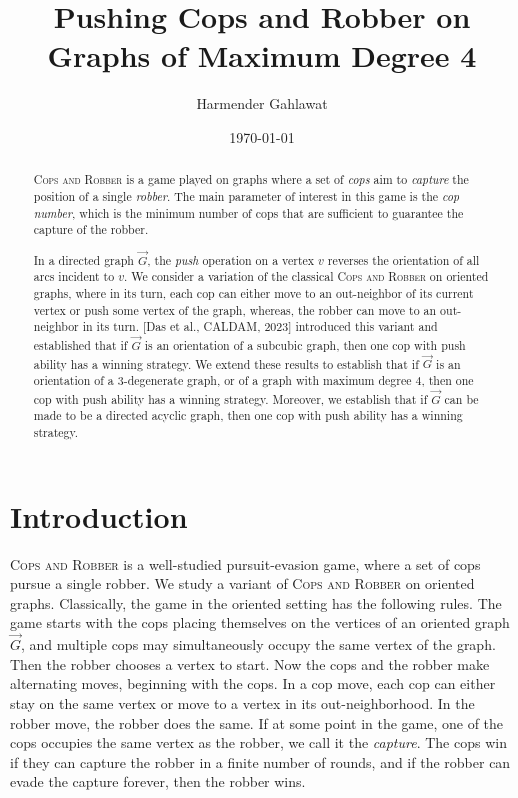 \documentclass[a4paper,12pt]{amsart}
\title[Pushing Cops and Robber]{Pushing Cops and Robber on Graphs of Maximum Degree 4}
\author[H.~Gahlawat]{Harmender Gahlawat}
\date{\today}
\newcommand{\CR}{\textsc{Cops and Robber}\xspace}
\begin{document}
\begin{abstract}
\textsc{Cops and Robber} is a game played on graphs where a set of \textit{cops} aim to \textit{capture} the position of a single \textit{robber}. The main parameter of interest in this game is the \textit{cop number}, which is the minimum number of cops that are sufficient to guarantee the capture of the robber. 

In a directed graph $\overrightarrow{G}$, the \textit{push} operation on a vertex $v$ reverses the orientation of all arcs incident to $v$. We consider a variation of the classical \textsc{Cops and Robber} on oriented graphs, where in its turn, each cop can either move to an out-neighbor of its current vertex or push some vertex of the graph, whereas, the robber can move to an out-neighbor in its turn. [Das et al., CALDAM, 2023] introduced this variant and established that if $\overrightarrow{G}$ is an orientation of a subcubic graph, then one cop with push ability has a winning strategy. We extend these results to establish that if $\overrightarrow{G}$ is an orientation of a $3$-degenerate graph, or of a graph with maximum degree $4$, then one cop with push ability has a winning strategy. Moreover, we establish that if $\overrightarrow{G}$ can be made to be a directed acyclic graph, then one cop with push ability has a winning strategy. 
\end{abstract}
\maketitle
\section{Introduction}\label{S:intro}
\CR is a well-studied pursuit-evasion game, where a set of cops pursue a single robber.  
We study a variant of \CR on oriented graphs. Classically, the game in the oriented setting has the following rules. The game starts with the cops placing themselves on the vertices of an oriented graph $\overrightarrow{G}$, and multiple cops may simultaneously occupy the same vertex of the graph. Then the robber chooses a vertex to start. Now the cops and the robber make alternating moves, beginning with the cops. In a cop move, each cop can either stay on the same vertex or move to a vertex in its out-neighborhood. In the robber move, the robber does the same. If at some point in the game, one of the cops occupies the same vertex as the robber, we call it the \textit{capture}. The cops win if they can capture the robber in a finite number of rounds, and if the robber can evade the capture forever, then the robber wins.
\end{document}
